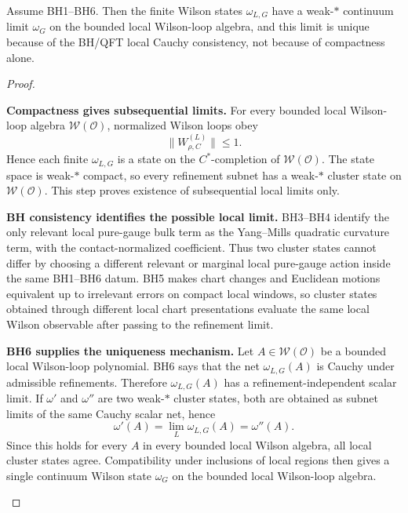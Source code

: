 \documentclass[12pt,a4paper]{article}
\begin{document}
\begin{lemma}
\label{p12:lem:wilson-state-compactness}
Assume BH1--BH6.  Then the finite Wilson states \(\omega_{L,G}\) have a weak-\(*\) continuum limit \(\omega_G\) on the bounded local Wilson-loop algebra, and this limit is unique because of the BH/QFT local Cauchy consistency, not because of compactness alone.
\end{lemma}
\begin{proof}

\begin{proofsteps}
\item \textbf{Compactness gives subsequential limits.}
For every bounded local Wilson-loop algebra \(\mathcal W(\mathcal O)\), normalized Wilson loops obey
\[
\|W_{\rho,C}^{(L)}\|\le1 .
\]
Hence each finite \(\omega_{L,G}\) is a state on the \(C^*\)-completion of \(\mathcal W(\mathcal O)\).  The state space is weak-\(*\) compact, so every refinement subnet has a weak-\(*\) cluster state on \(\mathcal W(\mathcal O)\).  This step proves existence of subsequential local limits only.

\item \textbf{BH consistency identifies the possible local limit.}
BH3--BH4 identify the only relevant local pure-gauge bulk term as the Yang--Mills quadratic curvature term, with the contact-normalized coefficient.  Thus two cluster states cannot differ by choosing a different relevant or marginal local pure-gauge action inside the same BH1--BH6 datum.  BH5 makes chart changes and Euclidean motions equivalent up to irrelevant errors on compact local windows, so cluster states obtained through different local chart presentations evaluate the same local Wilson observable after passing to the refinement limit.

\item \textbf{BH6 supplies the uniqueness mechanism.}
Let \(A\in\mathcal W(\mathcal O)\) be a bounded local Wilson-loop polynomial.  BH6 says that the net \(\omega_{L,G}(A)\) is Cauchy under admissible refinements.  Therefore \(\omega_{L,G}(A)\) has a refinement-independent scalar limit.  If \(\omega'\) and \(\omega''\) are two weak-\(*\) cluster states, both are obtained as subnet limits of the same Cauchy scalar net, hence
\[
\omega'(A)=\lim_L\omega_{L,G}(A)=\omega''(A).
\]
Since this holds for every \(A\) in every bounded local Wilson algebra, all local cluster states agree.  Compatibility under inclusions of local regions then gives a single continuum Wilson state \(\omega_G\) on the bounded local Wilson-loop algebra.
\end{proofsteps}
\end{proof}
\end{document}
